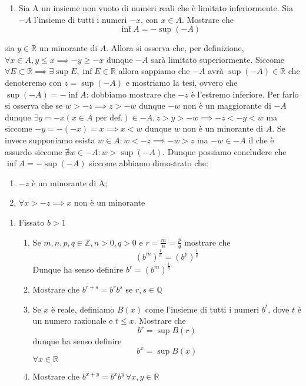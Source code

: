 \documentclass{report}
\begin{document}
\begin{enumerate}[resume, label=\protect\circled{\arabic*}]
	\item Sia A un insieme non vuoto di numeri reali che è limitato inferiormente. Sia $-A$ l'insieme di tutti i numeri $-x$, con $x \in A$. Mostrare che
	$$
		\inf{A} = - \sup{(-A)}
	$$
\end{enumerate}
\begin{mysolution}
	sia $y \in \mathbb{R}$ un minorante di $A$. Allora si osserva che, per definizione, $\forall x \in A, y \leq x \implies -y \geq -x$ dunque $-A$ sarà limitato superiormente. Siccome $\forall E \subset \mathbb{R} \implies \exists \sup{E}, \inf{E} \in \mathbb{R}$ allora sappiamo che $-A$ avrà $\sup{(-A)} \in \mathbb{R}$ che denoteremo con $z = \sup{(-A)}$ e mostriamo la tesi, ovvero che $\sup{(-A)} = -\inf{A}$: dobbiamo mostrare che $-z$ è l'estremo inferiore. Per farlo si osserva che se $w > -z \implies z > -w$ dunque $-w$ non è un maggiorante di $-A$ dunque $\exists y=-x(x \in A \text{ per def.}) \in -A, z > y > -w \implies -z < -y < w$ ma siccome $-y=-(-x) = x \implies x < w$ dunque $w$ non è un minorante di $A$. Se invece supponiamo esista $w \in A : w < -z \implies -w > z$ ma $-w \in -A$ il che è assurdo siccome $\nexists w \in -A: w > \sup{(-A)}$. Dunque possiamo concludere che $\inf{A} = -\sup{(-A)}$ siccome abbiamo dimostrato che:
\begin{enumerate}[label=\protect\circled{\arabic*}]
	\item $-z$ è un minorante di A;
	\item $\forall x > -z \implies x $ non è un minorante 
\end{enumerate}
\end{mysolution}
\begin{enumerate}[resume, label=\protect\circled{\arabic*}]
	\item Fissato $b>1$ \begin{enumerate}
		\item Se $m, n, p, q \in \mathbb{Z}, n>0, q>0$ e $r=\frac{m}{n} = \frac{p}{q}$ mostrare che
		$$
			(b^m)^{\frac{1}{n}} = (b^p)^{\frac{1}{q}}
 		$$
 		Dunque ha senso definire $b^r = (b^m)^{\frac{1}{n}}$
 		\item Mostrare che $b^{r+s} = b^r b^s$ se $r, s \in \mathbb{Q}$
 		\item Se $x$ è reale, definiamo $B(x)$ come l'insieme di tutti i numeri $b^t$, dove $t$ è un numero razionale e $t \leq x$. Mostrare che
 		$$
 			b^r = \sup{B(r)}
 		$$
 		dunque ha senso definire
 		$$
 		b^x = \sup{B(x)}
 		$$
 		$\forall x \in \mathbb{R}$
 		\item Mostrare che $b^{x+y}=b^x b^y \, \forall x, y \in \mathbb{R}$
	\end{enumerate}
\end{enumerate}
\end{document}
